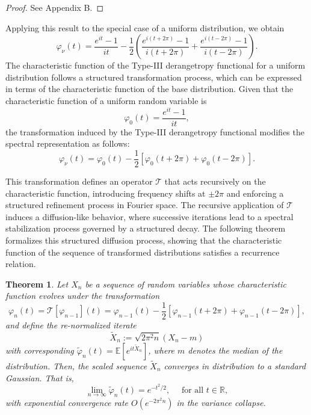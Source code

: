 \documentclass[sn-mathphys-num]{sn-jnl}%
\theoremstyle{thmstyleone}%
\newtheorem{theorem}{Theorem}%
\theoremstyle{thmstyletwo}%
\theoremstyle{thmstylethree}%
\begin{document}
\begin{proof}
	See Appendix B.
\end{proof}



Applying this result to the special case of a uniform distribution, we obtain
\begin{equation}
	\varphi_\nu(t)=\frac{e^{i t}-1}{i t}-\frac{1}{2}\left(\frac{e^{i(t+2 \pi)}-1}{i(t+2 \pi)}+\frac{e^{i(t-2 \pi)}-1}{i(t-2 \pi)}\right).
\end{equation}
The characteristic function of the Type-III derangetropy functional for a uniform distribution follows a structured transformation process, which can be expressed in terms of the characteristic function of the base distribution. Given that the characteristic function of a uniform random variable is
\begin{equation}
	\varphi_0(t)=\frac{e^{i t}-1}{i t},
\end{equation}
the transformation induced by the Type-III derangetropy functional modifies the spectral representation as follows:
\begin{equation}
	\varphi_{\nu}(t)=\varphi_0(t)-\frac{1}{2}\left[\varphi_0(t+2 \pi)+\varphi_0(t-2 \pi)\right].
\end{equation}

This transformation defines an operator $\mathcal{T}$ that acts recursively on the characteristic function, introducing frequency shifts at $\pm 2 \pi$ and enforcing a structured refinement process in Fourier space. The recursive application of $\mathcal{T}$ induces a diffusion-like behavior, where successive iterations lead to a spectral stabilization process governed by a structured decay. The following theorem formalizes this structured diffusion process, showing that the characteristic function of the sequence of transformed distributions satisfies a recurrence relation.

\begin{theorem}
	Let $X_n$ be a sequence of random variables whose characteristic function evolves under the transformation
	\begin{equation}
		\varphi_n(t)=\mathcal{T}\left[\varphi_{n-1}\right](t)=\varphi_{n-1}(t)-\frac{1}{2}\left[\varphi_{n-1}(t+2 \pi )+\varphi_{n-1}(t-2 \pi)\right],
	\end{equation}
	and define the re-normalized iterate	
	$$
	\widetilde{X}_n:=\sqrt{2 \pi^2 n}\left(X_n-m\right)
	$$	
	with corresponding $\widetilde{\varphi}_n(t)=\mathbb{E}\left[e^{i t \widetilde{X}_n}\right]$, where $m$ denotes the median of the distribution.
	Then, the scaled sequence $\widetilde{X}_n$ converges in distribution to a standard Gaussian. That is,
	$$
	\lim _{n \rightarrow \infty} \widetilde{\varphi}_n(t)=e^{-t^2 / 2}, \quad \text { for all } t \in \mathbb{R},
	$$	
	with exponential convergence rate $O\left(e^{-2 \pi^2 n}\right)$ in the variance collapse.
\end{theorem}
\end{document}
